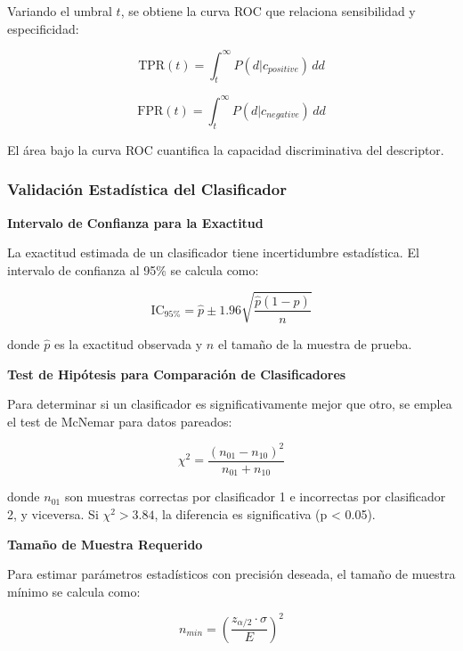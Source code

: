 Variando el umbral $t$, se obtiene la curva ROC que relaciona sensibilidad y especificidad:

\begin{equation}
\text{TPR}(t) = \int_t^{\infty} P(d|c_{positive}) \, dd
\end{equation}

\begin{equation}
\text{FPR}(t) = \int_t^{\infty} P(d|c_{negative}) \, dd
\end{equation}

El área bajo la curva ROC cuantifica la capacidad discriminativa del descriptor.

\subsubsection{Validación Estadística del Clasificador}

\textbf{Intervalo de Confianza para la Exactitud}

La exactitud estimada de un clasificador tiene incertidumbre estadística. El intervalo de confianza al 95\% se calcula como:

\begin{equation}
\text{IC}_{95\%} = \hat{p} \pm 1.96\sqrt{\frac{\hat{p}(1-\hat{p})}{n}}
\end{equation}

donde $\hat{p}$ es la exactitud observada y $n$ el tamaño de la muestra de prueba.

\textbf{Test de Hipótesis para Comparación de Clasificadores}

Para determinar si un clasificador es significativamente mejor que otro, se emplea el test de McNemar para datos pareados:

\begin{equation}
\chi^2 = \frac{(n_{01} - n_{10})^2}{n_{01} + n_{10}}
\end{equation}

donde $n_{01}$ son muestras correctas por clasificador 1 e incorrectas por clasificador 2, y viceversa. Si $\chi^2 > 3.84$, la diferencia es significativa (p < 0.05).

\textbf{Tamaño de Muestra Requerido}

Para estimar parámetros estadísticos con precisión deseada, el tamaño de muestra mínimo se calcula como:

\begin{equation}
n_{min} = \left(\frac{z_{\alpha/2} \cdot \sigma}{E}\right)^2
\end{equation}

